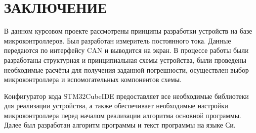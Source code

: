 \begin{sloppypar} %
\newpage %

\section*{ЗАКЛЮЧЕНИЕ} %

В данном курсовом проекте рассмотрены принципы разработки устройств на базе микроконтроллеров. Был разработан измеритель постоянного тока. Данные передаются по интерфейсу CAN и выводится на экран. В процессе работы были разработаны структурная и принципиальная схемы устройства, были проведены необходимые расчёты для получения заданной погрешности, осуществлен выбор микроконтроллера и вспомогательных компонентов схемы. 


Конфигуратор кода STM32CubeIDE предоставляет все необходимые библиотеки для реализации устройства, а также обеспечивает необходимые настройки микроконтроллера перед началом реализации алгоритма основной программы. Далее был разработан алгоритм программы и текст программы на языке Си. 


\end{sloppypar}
